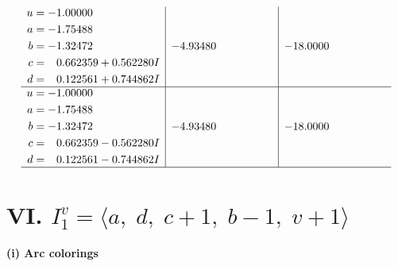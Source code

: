 \documentclass[1p]{elsarticle_modified}
\theoremstyle{definition}
\begin{document}
$$\begin{array}{c|c|c}
\begin{aligned}
u &= -1.00000\phantom{ +0.000000I} \\
a &= -1.75488\phantom{ +0.000000I} \\
b &= -1.32472\phantom{ +0.000000I} \\
c &= \phantom{-}0.662359 + 0.562280 I \\
d &= \phantom{-}0.122561 + 0.744862 I\end{aligned}
 & -4.93480\phantom{ +0.000000I} & -18.0000\phantom{ +0.000000I} \\ \hline\begin{aligned}
u &= -1.00000\phantom{ +0.000000I} \\
a &= -1.75488\phantom{ +0.000000I} \\
b &= -1.32472\phantom{ +0.000000I} \\
c &= \phantom{-}0.662359 - 0.562280 I \\
d &= \phantom{-}0.122561 - 0.744862 I\end{aligned}
 & -4.93480\phantom{ +0.000000I} & -18.0000\phantom{ +0.000000I}\\
 \hline 
 \end{array}$$\newpage\newpage\renewcommand{\arraystretch}{1}
\centering \section*{VI. $I^v_{1}= \langle a,\;d,\;c+1,\;b-1,\;v+1 \rangle$}
\flushleft \textbf{(i) Arc colorings}\\
\end{document}
